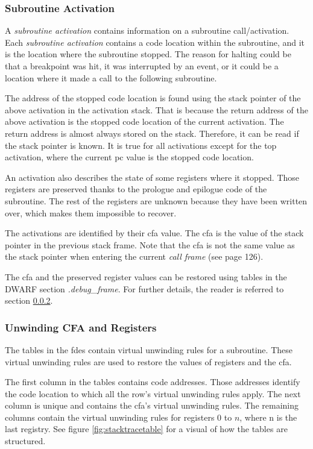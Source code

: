 \subsubsection{Subroutine Activation} \label{sec:subact}
A \emph{subroutine activation} contains information on a subroutine call/activation.
Each \emph{subroutine activation} contains a code location within the subroutine, and it is the location where the subroutine stopped.
The reason for halting could be that a breakpoint was hit, it was interrupted by an event, or it could be a location where it made a call to the following subroutine.


The address of the stopped code location is found using the stack pointer of the above activation in the activation stack.
That is because the return address of the above activation is the stopped code location of the current activation.
The return address is almost always stored on the stack.
Therefore, it can be read if the stack pointer is known.
It is true for all activations except for the top activation, where the current \gls{pc} value is the stopped code location.


An activation also describes the state of some registers where it stopped.
Those registers are preserved thanks to the prologue and epilogue code of the subroutine.
The rest of the registers are unknown because they have been written over, which makes them impossible to recover.


The activations are identified by their \gls{cfa} value.
The \gls{cfa} is the value of the stack pointer in the previous stack frame.
Note that the \gls{cfa} is not the same value as the stack pointer when entering the current \emph{call frame} (see \cite{dwarf} page 126).


The \gls{cfa} and the preserved register values can be restored using tables in the \gls{DWARF} section \emph{.debug\_frame}.
For further details, the reader is referred to section \ref{sec:evalcfa}.



\subsubsection{Unwinding CFA and Registers} \label{sec:evalcfa}
The tables in the \glspl{fde} contain virtual unwinding rules for a subroutine.
These virtual unwinding rules are used to restore the values of registers and the \gls{cfa}.


The first column in the tables contains code addresses.
Those addresses identify the code location to which all the row's virtual unwinding rules apply.
The next column is unique and contains the \gls{cfa}'s virtual unwinding rules. 
The remaining columns contain the virtual unwinding rules for registers $0$ to $n$, where n is the last registry.
See figure \ref{fig:stacktracetable} for a visual of how the tables are structured.



